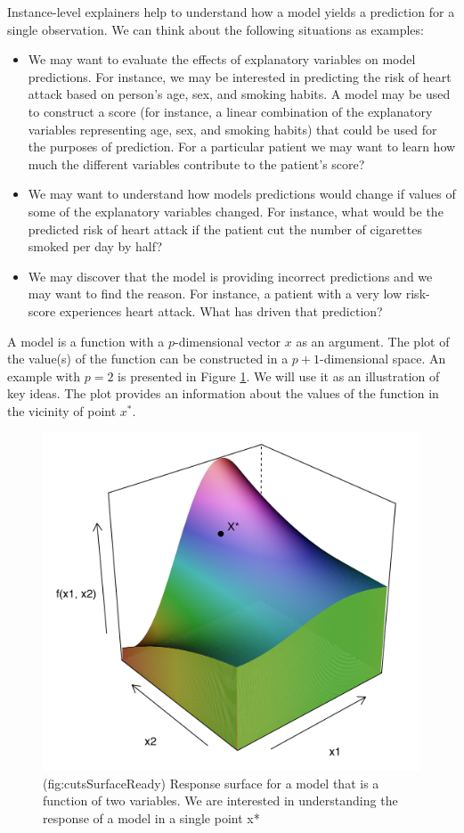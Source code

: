 \documentclass[12pt,]{krantz}
\providecommand{\tightlist}{%
  \setlength{\itemsep}{0pt}\setlength{\parskip}{0pt}}
\begin{document}
Instance-level explainers help to understand how a model yields a prediction for a single observation. We can think about the following situations as examples:

\begin{itemize}
\tightlist
\item
  We may want to evaluate the effects of explanatory variables on model predictions. For instance, we may be interested in predicting the risk of heart attack based on person's age, sex, and smoking habits. A model may be used to construct a score (for instance, a linear combination of the explanatory variables representing age, sex, and smoking habits) that could be used for the purposes of prediction. For a particular patient we may want to learn how much the different variables contribute to the patient's score?
\item
  We may want to understand how models predictions would change if values of some of the explanatory variables changed. For instance, what would be the predicted risk of heart attack if the patient cut the number of cigarettes smoked per day by half?
\item
  We may discover that the model is providing incorrect predictions and we may want to find the reason. For instance, a patient with a very low risk-score experiences heart attack. What has driven that prediction?
\end{itemize}

A model is a function with a \(p\)-dimensional vector \(x\) as an argument. The plot of the value(s) of the function can be constructed in a \(p+1\)-dimensional space. An example with \(p=2\) is presented in Figure \ref{fig:cutsSurfaceReady}. We will use it as an illustration of key ideas. The plot provides an information about the values of the function in the vicinity of point \(x^*\).

\begin{figure}

{\centering \includegraphics[width=0.6\linewidth]{figure/cuts_surface_ready_punkt} 

}

\caption{(fig:cutsSurfaceReady) Response surface for a model that is a function of two variables. We are interested in understanding the response of a model in a single point x*}\label{fig:cutsSurfaceReady}
\end{figure}
\end{document}
